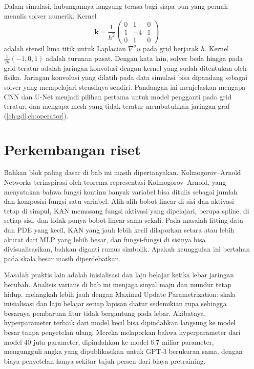Dalam simulasi, hubungannya langsung terasa bagi siapa pun yang pernah menulis solver numerik. Kernel
\[
\bm k=\frac1{h^2}\begin{pmatrix}0&1&0\\1&-4&1\\0&1&0\end{pmatrix}
\]
adalah stensil lima titik untuk Laplacian $\nabla^2u$ pada grid berjarak $h$. Kernel
$\tfrac1{2h}(-1,0,1)$ adalah turunan pusat. Dengan kata lain, solver beda hingga pada grid teratur
adalah jaringan konvolusi dengan kernel yang sudah ditentukan oleh fisika. Jaringan konvolusi
yang dilatih pada data simulasi bisa dipandang sebagai solver yang mempelajari stensilnya sendiri.
Pandangan ini menjelaskan mengapa CNN dan U-Net menjadi pilihan pertama untuk model pengganti
pada grid teratur, dan mengapa mesh yang tidak teratur membutuhkan jaringan graf
(\cref{ch:gdl,ch:operator}).

\section{Perkembangan riset}

Bahkan blok paling dasar di bab ini masih dipertanyakan. Kolmogorov--Arnold Networks \citep{liu2024kan} terinspirasi oleh
teorema representasi Kolmogorov--Arnold, yang menyatakan bahwa fungsi kontinu banyak variabel bisa ditulis sebagai jumlah
dan komposisi fungsi satu variabel. Alih-alih bobot linear di sisi dan aktivasi tetap di simpul, KAN memasang fungsi
aktivasi yang dipelajari, berupa spline, di setiap sisi, dan tidak punya bobot linear sama sekali. Pada masalah fitting
data dan PDE yang kecil, KAN yang jauh lebih kecil dilaporkan setara atau lebih akurat dari MLP yang lebih besar, dan
fungsi-fungsi di sisinya bisa divisualisasikan, bahkan diganti rumus simbolik. Apakah keunggulan ini bertahan pada skala
besar masih diperdebatkan.

Masalah praktis lain adalah inisialisasi dan laju belajar ketika lebar jaringan berubah. Analisis varians di bab ini
menjaga sinyal maju dan mundur tetap hidup. \citet{yang2022mup} melangkah lebih jauh dengan Maximal Update
Parametrization: skala inisialisasi dan laju belajar setiap lapisan diatur sedemikian rupa sehingga besarnya pembaruan
fitur tidak bergantung pada lebar. Akibatnya, hyperparameter terbaik dari model kecil bisa dipindahkan langsung ke model
besar tanpa penyetelan ulang. Mereka melaporkan bahwa hyperparameter dari model 40 juta parameter, dipindahkan ke model
6,7 miliar parameter, mengungguli angka yang dipublikasikan untuk GPT-3 berukuran sama, dengan biaya penyetelan hanya
sekitar tujuh persen dari biaya pretraining.

